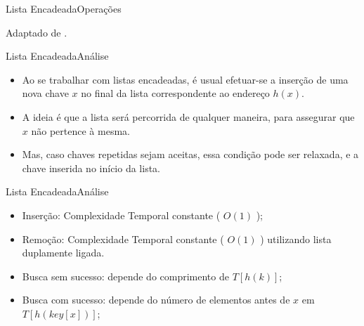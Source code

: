 \documentclass[aspectratio=169]{beamer}
\begin{document}
\begin{frame}{Lista Encadeada}{Operações}



\tiny{Adaptado de .}
\end{frame}

\begin{frame}{Lista Encadeada}{Análise}
\begin{itemize}
\item Ao se trabalhar com listas encadeadas, é usual efetuar-se a inserção de uma nova chave $x$ no final da lista correspondente ao endereço $h(x)$.
\item A ideia é que a lista será percorrida de qualquer maneira, para assegurar que $x$ não pertence à mesma.
\item Mas, caso chaves repetidas sejam aceitas, essa condição pode ser relaxada, e a chave inserida no início da lista.
\end{itemize}
\end{frame}

\begin{frame}{Lista Encadeada}{Análise}
\begin{itemize}
 \item Inserção: Complexidade Temporal constante ( $O(1)$ );
 \item Remoção: Complexidade Temporal constante ( $O(1)$ ) utilizando lista duplamente ligada.
 \item Busca sem sucesso: depende do comprimento de $T [h(k)]$;
 \item Busca com sucesso: depende do número de elementos antes de $x$ em $T [h(key [x])]$;
\end{itemize}
\end{frame}
\end{document}
